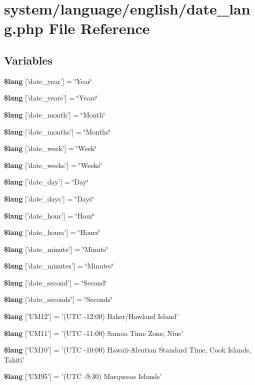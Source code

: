 \section{system/language/english/date\-\_\-lang.php File Reference}
\label{date__lang_8php}
\subsection*{Variables}
\begin{DoxyCompactItemize}
\item 
{\bf \$lang} ['date\-\_\-year'] = \char`\"{}Year\char`\"{}
\item 
{\bf \$lang} ['date\-\_\-years'] = \char`\"{}Years\char`\"{}
\item 
{\bf \$lang} ['date\-\_\-month'] = \char`\"{}Month\char`\"{}
\item 
{\bf \$lang} ['date\-\_\-months'] = \char`\"{}Months\char`\"{}
\item 
{\bf \$lang} ['date\-\_\-week'] = \char`\"{}Week\char`\"{}
\item 
{\bf \$lang} ['date\-\_\-weeks'] = \char`\"{}Weeks\char`\"{}
\item 
{\bf \$lang} ['date\-\_\-day'] = \char`\"{}Day\char`\"{}
\item 
{\bf \$lang} ['date\-\_\-days'] = \char`\"{}Days\char`\"{}
\item 
{\bf \$lang} ['date\-\_\-hour'] = \char`\"{}Hour\char`\"{}
\item 
{\bf \$lang} ['date\-\_\-hours'] = \char`\"{}Hours\char`\"{}
\item 
{\bf \$lang} ['date\-\_\-minute'] = \char`\"{}Minute\char`\"{}
\item 
{\bf \$lang} ['date\-\_\-minutes'] = \char`\"{}Minutes\char`\"{}
\item 
{\bf \$lang} ['date\-\_\-second'] = \char`\"{}Second\char`\"{}
\item 
{\bf \$lang} ['date\-\_\-seconds'] = \char`\"{}Seconds\char`\"{}
\item 
{\bf \$lang} ['U\-M12'] = '(U\-T\-C -\/12\-:00) Baker/Howland Island'
\item 
{\bf \$lang} ['U\-M11'] = '(U\-T\-C -\/11\-:00) Samoa Time Zone, Niue'
\item 
{\bf \$lang} ['U\-M10'] = '(U\-T\-C -\/10\-:00) Hawaii-\/Aleutian Standard Time, Cook Islands, Tahiti'
\item 
{\bf \$lang} ['U\-M95'] = '(U\-T\-C -\/9\-:30) Marquesas Islands'

\end{DoxyCompactItemize}
